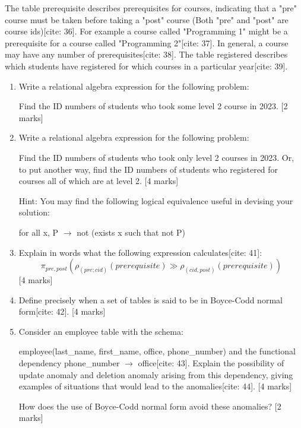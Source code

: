 The table prerequisite describes prerequisites for courses, indicating that a "pre" course must be taken before taking a "post" course (Both "pre" and "post" are course ids)[cite: 36]. For example a course called "Programming 1" might be a prerequisite for a course called "Programming 2"[cite: 37]. In general, a course may have any number of prerequisites[cite: 38]. The table registered describes which students have registered for which courses in a particular year[cite: 39].
\begin{enumerate}
    \item[(a)] Write a relational algebra expression for the following problem:

    Find the ID numbers of students who took some level 2 course in 2023. [2 marks]

    \item[(b)] Write a relational algebra expression for the following problem:

    Find the ID numbers of students who took only level 2 courses in 2023. Or, to put another way, find the ID numbers of students who registered for courses all of which are at level 2. [4 marks]

    Hint: You may find the following logical equivalence useful in devising your solution:

    for all x, P $\rightarrow$ not (exists x such that not P)

    \item[(c)] Explain in words what the following expression calculates[cite: 41]:
    $$\pi_{pre,post}(\rho_{(pre;cid)}(prerequisite)\gg\rho_{(cid,post)}(prerequisite))$$
    [4 marks]

    \item[(d)] Define precisely when a set of tables is said to be in Boyce-Codd normal form[cite: 42]. [4 marks]
    \item[(e)] Consider an employee table with the schema:

    employee(last\_name, first\_name, office, phone\_number)
    and the functional dependency phone\_number $\rightarrow$ office[cite: 43]. Explain the possibility of update anomaly and deletion anomaly arising from this dependency, giving examples of situations that would lead to the anomalies[cite: 44]. [4 marks]

    How does the use of Boyce-Codd normal form avoid these anomalies? [2 marks]
\end{enumerate}
